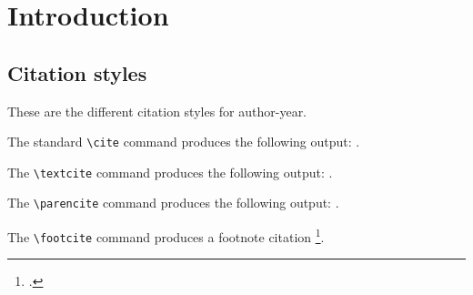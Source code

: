\chapter{Introduction}
\label{chap:introduction}

\section{Citation styles}

These are the different citation styles for author-year.

\noindent The standard \verb=\cite= command produces the following output: \cite{cybenko1989}.

\noindent The \verb=\textcite= command produces the following output: \textcite{cybenko1989}.


\noindent The \verb=\parencite= command produces the following output: \parencite{cybenko1989}.

\noindent The \verb=\footcite= command produces a footnote citation \footcite{cybenko1989}.


